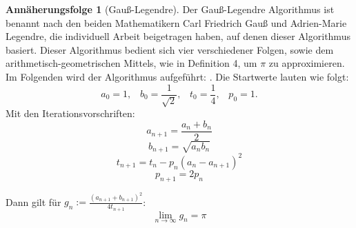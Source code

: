 \documentclass{scrartcl}
\theoremstyle{definition}
\newtheorem{approximation sequence}{Annäherungsfolge}
\begin{document}
\begin{approximation sequence}[Gauß-Legendre]

Der Gauß-Legendre Algorithmus ist benannt nach den beiden Mathematikern Carl
Friedrich Gauß und Adrien-Marie Legendre, die individuell Arbeit beigetragen
haben, auf denen dieser Algorithmus basiert. Dieser Algorithmus bedient sich
vier verschiedener Folgen, sowie dem arithmetisch-geometrischen Mittels, wie in
Definition 4, um \(\pi\) zu approximieren. Im Folgenden wird der Algorithmus
aufgeführt: \cite{AGM-Gauß-Legendre}. Die Startwerte lauten wie folgt:
\begin{equation*}
    a_0 = 1, \;\;\; b_0 = \frac{1}{\sqrt{2}}, \;\;\; t_0 = \frac{1}{4}, \;\;\; p_0 = 1.
\end{equation*}
Mit den Iterationsvorschriften:
\[a_{n+1} = \frac{a_n + b_n}{2} \]
\[b_{n+1} = \sqrt{a_nb_n} \]
\[t_{n+1} = t_n - p_n(a_n - a_{n+1})^2 \]
\[p_{n+1} = 2p_n \]

Dann gilt für \(g_n := \frac{(a_{n+1} + b_{n+1})^2}{4t_{n+1}}\):
\begin{equation*}
    \lim_{n \to \infty}g_n = \pi
\end{equation*}


\end{approximation sequence}
\end{document}

